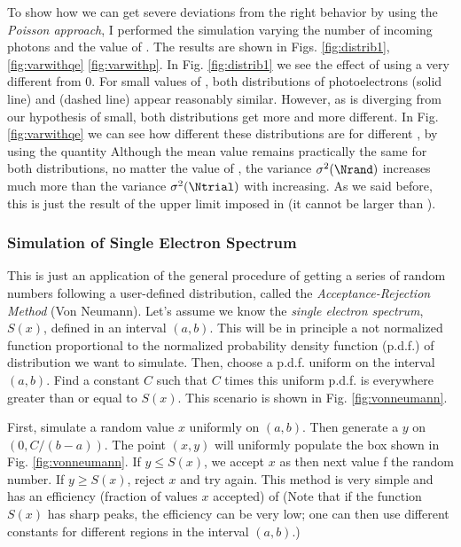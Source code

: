 To show how we can get severe deviations from the right behavior by
using the \emph{Poisson approach}, I performed the simulation varying
the number of incoming photons and the value of \QEo. The results are
shown in Figs. \ref{fig:distrib1}, \ref{fig:varwithqe}
\ref{fig:varwithp}. In Fig. \ref{fig:distrib1} we see the effect of
using a \QEo very different from $0$. For small values of \QEo, both
distributions of photoelectrons \Ntrial (solid line) and \Nrand
(dashed line) appear reasonably similar. However, as \QEo is diverging
from our hypothesis of \QEo small, both distributions get more and
more different. In Fig. \ref{fig:varwithqe} we can see how different
these distributions are for different \QEo, by using the quantity
%
\varquoteq
%
Although the mean value remains practically the same for both
distributions, no matter the value of \QEo, the variance
$\sigma^2(\Nrand)$ increases much more than the variance
$\sigma^2(\Ntrial)$ with \QEo increasing. As we said before, this is
just the result of the upper limit imposed in \Ntrial (it cannot be
larger than \Nphot).

\subsubsection{Simulation of Single Electron Spectrum}

This is just an application of the general procedure of getting a
series of random numbers following a user-defined distribution, called
the \emph{Acceptance-Rejection Method} (Von Neumann). Let's assume we
know the \emph{single electron spectrum}, $S(x)$, defined in an
interval $(a,b)$. This will be in principle a not normalized function
proportional to the normalized probability density function (p.d.f.)
of distribution we want to simulate. Then, choose a p.d.f. uniform on
the interval $(a,b)$. Find a constant $C$ such that $C$ times this
uniform p.d.f.  is everywhere greater than or equal to $S(x)$. This
scenario is shown in Fig. \ref{fig:vonneumann}.

First, simulate a random value $x$ uniformly on $(a,b)$. Then generate
a $y$ on $(0,C/(b-a))$. The point $(x,y)$ will uniformly populate the
box shown in Fig. \ref{fig:vonneumann}. If $y\le S(x)$, we accept $x$
as then next value f the random number. If $y\geq S(x)$, reject $x$
and try again.  This method is very simple and has an efficiency
(fraction of values $x$ accepted) of
%
\vonneumanneffeq
%
(Note that if the function $S(x)$ has sharp peaks, the efficiency can
be very low; one can then use different constants for different
regions in the interval $(a,b)$.)

